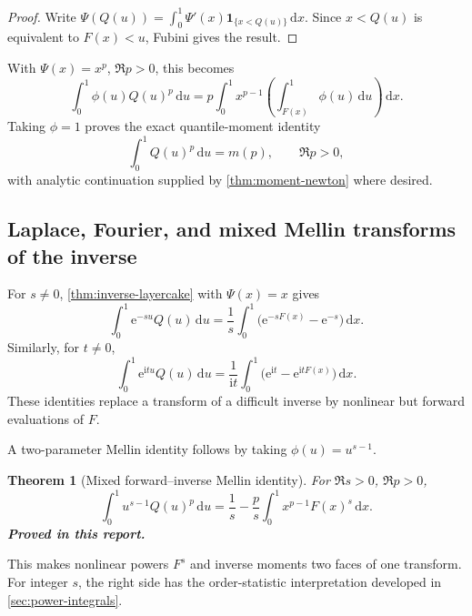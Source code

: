 \documentclass[11pt,oneside]{article}
\numberwithin{equation}{section}
\newtheorem{theorem}{Theorem}[section]
\theoremstyle{definition}
\theoremstyle{remark}
\newcommand{\e}{\mathrm e}
\newcommand{\ii}{\mathrm i}
\newcommand{\dd}{\,\mathrm d}
\newcommand{\QF}{Q}
\newcommand{\statusproved}{\textcolor{proofgreen}{\textbf{Proved in this report.}}}
\begin{document}
\begin{proof}
Write
\(\Psi(\QF(u))=\int_0^1\Psi'(x)\mathbf1_{\{x<\QF(u)\}}\dd x\).
Since \(x<\QF(u)\) is equivalent to \(F(x)<u\), Fubini gives the result.
\end{proof}

With \(\Psi(x)=x^p\), \(\Re p>0\), this becomes
\begin{equation}
 \int_0^1\phi(u)\QF(u)^p\dd u
 =p\int_0^1x^{p-1}\left(\int_{F(x)}^1\phi(u)\dd u\right)\dd x.
 \label{eq:inverse-power-layercake}
\end{equation}
Taking \(\phi=1\) proves the exact quantile-moment identity
\begin{equation}
 \boxed{\int_0^1\QF(u)^p\dd u=m(p),}
 \qquad \Re p>0,
 \label{eq:quantile-moments}
\end{equation}
with analytic continuation supplied by \cref{thm:moment-newton} where desired.

\subsection{Laplace, Fourier, and mixed Mellin transforms of the inverse}

For \(s\ne0\), \cref{thm:inverse-layercake} with \(\Psi(x)=x\) gives
\begin{equation}
 \boxed{
 \int_0^1\e^{-su}\QF(u)\dd u
 =\frac1s\int_0^1\bigl(\e^{-sF(x)}-\e^{-s}\bigr)\dd x.}
 \label{eq:Q-Laplace}
\end{equation}
Similarly, for \(t\ne0\),
\begin{equation}
 \boxed{
 \int_0^1\e^{\ii tu}\QF(u)\dd u
 =\frac1{\ii t}\int_0^1\bigl(\e^{\ii t}-\e^{\ii tF(x)}\bigr)\dd x.}
 \label{eq:Q-Fourier}
\end{equation}
These identities replace a transform of a difficult inverse by nonlinear but
forward evaluations of \(F\).

A two-parameter Mellin identity follows by taking \(\phi(u)=u^{s-1}\).

\begin{theorem}[Mixed forward--inverse Mellin identity]
\label{thm:mixed-Mellin-Q}
For \(\Re s>0\), \(\Re p>0\),
\begin{equation}
 \boxed{
 \int_0^1u^{s-1}\QF(u)^p\dd u
 =\frac1s-\frac p s\int_0^1x^{p-1}F(x)^s\dd x.}
 \label{eq:mixed-Mellin-Q}
\end{equation}
\statusproved
\end{theorem}

This makes nonlinear powers \(F^s\) and inverse moments two faces of one
transform.  For integer \(s\), the right side has the order-statistic
interpretation developed in \cref{sec:power-integrals}.
\end{document}
